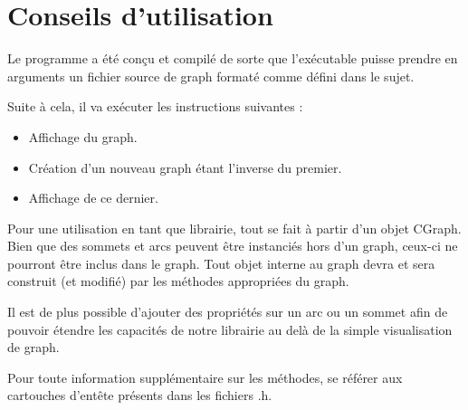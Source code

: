 	\chapter{Conseils d'utilisation}
	Le programme a été conçu et compilé de sorte que l'exécutable puisse prendre en arguments un fichier source de graph formaté comme défini dans le sujet.
	
	Suite à cela, il va exécuter les instructions suivantes :
	\begin{itemize}
		\item Affichage du graph.
		\item Création d'un nouveau graph étant l'inverse du premier.
		\item Affichage de ce dernier. \\
	\end{itemize}
	Pour une utilisation en tant que librairie, tout se fait à partir d'un objet CGraph. Bien que des sommets et arcs peuvent être instanciés hors d'un graph, ceux-ci ne pourront être inclus dans le graph. Tout objet interne au graph devra et sera construit (et modifié) par les méthodes appropriées du graph.
	
	Il est de plus possible d'ajouter des propriétés sur un arc ou un sommet afin de pouvoir étendre les capacités de notre librairie au delà de la simple visualisation de graph.

	Pour toute information supplémentaire sur les méthodes, se référer aux cartouches d'entête présents dans les fichiers .h.

